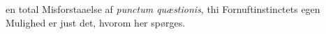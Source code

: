 \documentclass[12pt]{book}
\newcommand{\opage}[1]{\marginnote{\footnotesize\textit{[#1]}}}
\begin{document}
\opage{225} en total Misforstaaelse af \textit{punctum quæstionis}, thi Fornuftinstinctets egen Mulighed
er just det, hvorom her spørges.
\end{document}
